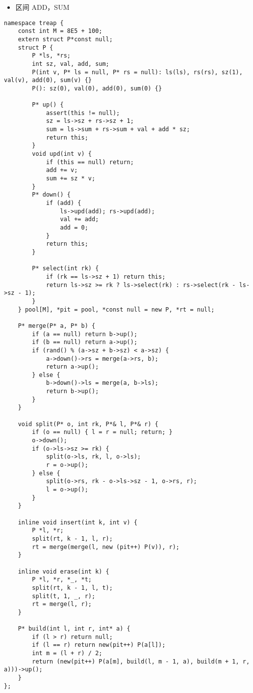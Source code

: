 \documentclass[]{article}
\providecommand{\tightlist}{%
  \setlength{\itemsep}{0pt}\setlength{\parskip}{0pt}}
\begin{document}
\begin{itemize}
\tightlist
\item
  区间 ADD，SUM
\end{itemize}

\begin{verbatim}
namespace treap {
    const int M = 8E5 + 100;
    extern struct P*const null;
    struct P {
        P *ls, *rs;
        int sz, val, add, sum;
        P(int v, P* ls = null, P* rs = null): ls(ls), rs(rs), sz(1), val(v), add(0), sum(v) {}
        P(): sz(0), val(0), add(0), sum(0) {}

        P* up() {
            assert(this != null);
            sz = ls->sz + rs->sz + 1;
            sum = ls->sum + rs->sum + val + add * sz;
            return this;
        }
        void upd(int v) {
            if (this == null) return;
            add += v;
            sum += sz * v;
        }
        P* down() {
            if (add) {
                ls->upd(add); rs->upd(add);
                val += add;
                add = 0;
            }
            return this;
        }

        P* select(int rk) {
            if (rk == ls->sz + 1) return this;
            return ls->sz >= rk ? ls->select(rk) : rs->select(rk - ls->sz - 1);
        }
    } pool[M], *pit = pool, *const null = new P, *rt = null;

    P* merge(P* a, P* b) {
        if (a == null) return b->up();
        if (b == null) return a->up();
        if (rand() % (a->sz + b->sz) < a->sz) {
            a->down()->rs = merge(a->rs, b);
            return a->up();
        } else {
            b->down()->ls = merge(a, b->ls);
            return b->up();
        }
    }

    void split(P* o, int rk, P*& l, P*& r) {
        if (o == null) { l = r = null; return; }
        o->down();
        if (o->ls->sz >= rk) {
            split(o->ls, rk, l, o->ls);
            r = o->up();
        } else {
            split(o->rs, rk - o->ls->sz - 1, o->rs, r);
            l = o->up();
        }
    }

    inline void insert(int k, int v) {
        P *l, *r;
        split(rt, k - 1, l, r);
        rt = merge(merge(l, new (pit++) P(v)), r);
    }

    inline void erase(int k) {
        P *l, *r, *_, *t;
        split(rt, k - 1, l, t);
        split(t, 1, _, r);
        rt = merge(l, r);
    }

    P* build(int l, int r, int* a) {
        if (l > r) return null;
        if (l == r) return new(pit++) P(a[l]);
        int m = (l + r) / 2;
        return (new(pit++) P(a[m], build(l, m - 1, a), build(m + 1, r, a)))->up();
    }
};
\end{verbatim}
\end{document}
